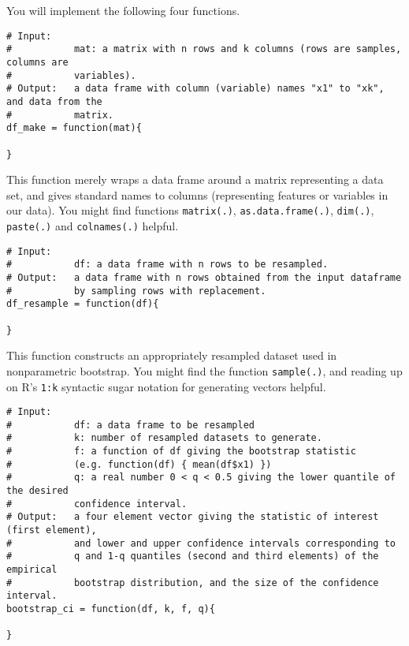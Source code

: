 \documentclass[11pt]{article}
\begin{document}
You will implement the following four functions.

\begin{lstlisting}
# Input:
#           mat: a matrix with n rows and k columns (rows are samples, columns are
#           variables).
# Output:   a data frame with column (variable) names "x1" to "xk", and data from the
#           matrix.
df_make = function(mat){

}
\end{lstlisting}

This function merely wraps a data frame around a matrix representing a data set, and gives standard names to columns (representing features or variables in our data).  You might find functions \texttt{matrix(.)}, \texttt{as.data.frame(.)}, \texttt{dim(.)}, \texttt{paste(.)} and \texttt{colnames(.)} helpful.

\begin{lstlisting}
# Input:
#           df: a data frame with n rows to be resampled.
# Output:   a data frame with n rows obtained from the input dataframe
#           by sampling rows with replacement.
df_resample = function(df){

}
\end{lstlisting}

This function constructs an appropriately resampled dataset used in nonparametric bootstrap.  You might find the function
\texttt{sample(.)}, and reading up on R's \texttt{1:k} syntactic sugar notation for generating vectors helpful.

\begin{lstlisting}
# Input:
#           df: a data frame to be resampled
#           k: number of resampled datasets to generate.
#           f: a function of df giving the bootstrap statistic
#           (e.g. function(df) { mean(df$x1) })
#           q: a real number 0 < q < 0.5 giving the lower quantile of the desired
#           confidence interval.
# Output:   a four element vector giving the statistic of interest (first element),
#           and lower and upper confidence intervals corresponding to
#           q and 1-q quantiles (second and third elements) of the empirical
#           bootstrap distribution, and the size of the confidence interval.
bootstrap_ci = function(df, k, f, q){

}
\end{lstlisting}
\end{document}
